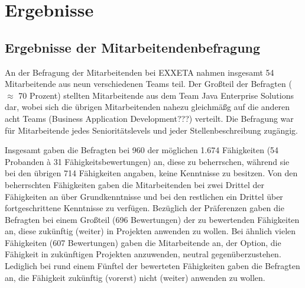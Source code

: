 
\chapter{Ergebnisse}
\label{ch:ergebnisse}

\section{Ergebnisse der Mitarbeitendenbefragung}
An der Befragung der Mitarbeitenden bei EXXETA nahmen insgesamt 54 Mitarbeitende aus neun verschiedenen Teams teil.
Der Großteil der Befragten ($\approx$ 70 Prozent) stellten Mitarbeitende aus dem Team Java Enterprise Solutions dar, wobei sich die übrigen Mitarbeitenden nahezu gleichmäßg auf die anderen acht Teams (Business Application Development???) verteilt.
Die Befragung war für Mitarbeitende jedes Senioritätslevels und jeder Stellenbeschreibung zugängig.


Insgesamt gaben die Befragten bei 960 der möglichen 1.674 Fähigkeiten (54 Probanden \`{a} 31 Fähigkeitsbewertungen) an, diese zu beherrschen, während sie bei den übrigen 714 Fähigkeiten angaben, keine Kenntnisse zu besitzen.
Von den beherrschten Fähigkeiten gaben die Mitarbeitenden bei zwei Drittel der Fähigkeiten an über Grundkenntnisse und bei den restlichen ein Drittel über fortgeschrittene Kenntnisse zu verfügen.
Bezüglich der Präferenzen gaben die Befragten bei einem Großteil (696 Bewertungen) der zu bewertenden Fähigkeiten an, diese zukünftig (weiter) in Projekten anwenden zu wollen.
Bei ähnlich vielen Fähigkeiten (607 Bewertungen) gaben die Mitarbeitende an, der Option, die Fähigkeit in zukünftigen Projekten anzuwenden, neutral gegenüberzustehen.
Lediglich bei rund einem Fünftel der bewerteten Fähigkeiten gaben die Befragten an, die Fähigkeit zukünftig (vorerst) nicht (weiter) anwenden zu wollen.

